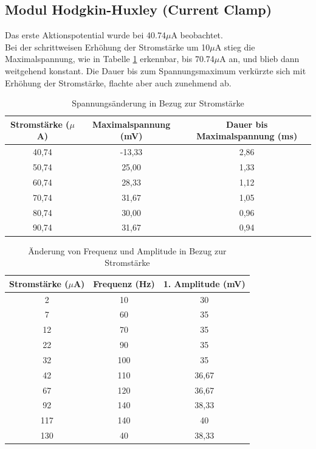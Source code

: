 \documentclass[a4paper]{article}
\begin{document}
\newpage
\subsection{Modul Hodgkin-Huxley (Current Clamp)}

Das erste Aktionspotential wurde bei 40.74\(\mu\)A beobachtet.\\
Bei der schrittweisen Erhöhung der Stromstärke um 10\(\mu\)A stieg die Maximalspannung, wie in  Tabelle \ref{tab:A2_3} erkennbar, bis 70.74\(\mu\)A an, und blieb dann weitgehend konstant. Die Dauer bis zum Spannungsmaximum verkürzte sich mit Erhöhung der Stromstärke, flachte aber auch zunehmend ab.

\vspace{2.5\baselineskip}

\begin{table}[H]
    \centering
    \caption{Spannungsänderung in Bezug zur Stromstärke}
    \begin{tabular}{c||c|c}
        Stromstärke (\(\mu\)A) & Maximalspannung (mV) & Dauer bis Maximalspannung (ms)\\
        \hline
        40,74 & -13,33 & 2,86 \\
        50,74 & 25,00 & 1,33\\
        60,74 & 28,33 & 1,12\\
        70,74 & 31,67 & 1,05\\
        80,74 & 30,00 & 0,96\\
        90,74 & 31,67 & 0,94\\
    \end{tabular}
    \label{tab:A2_3}
\end{table}

\begin{table}[H]
    \centering
    \caption{Änderung von Frequenz und Amplitude in Bezug zur Stromstärke}
    \begin{tabular}{c||c|c}
        Stromstärke (\(\mu\)A) & Frequenz (Hz) & 1. Amplitude (mV) \\
        \hline
        2 & 10 & 30\\
        7 & 60 & 35\\
        12 & 70 & 35\\
        22 & 90 & 35\\
        32 & 100 & 35\\
        42 & 110 & 36,67\\
        67 & 120 & 36,67\\
        92 & 140 & 38,33\\
        117 & 140 & 40\\
        130 & 40 & 38,33
    \end{tabular}
    \label{tab:A2_4}
\end{table}
\end{document}
